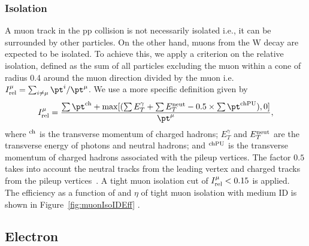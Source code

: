 \subsubsection{Isolation}
A muon track in the pp collision is not necessarily isolated i.e., it can be 
surrounded by other particles. On the other hand, muons from the W decay are 
expected to be isolated. To achieve this, we apply a criterion on the relative
isolation, defined as the \pt sum of all particles excluding the muon within a 
cone of radius 0.4 around the muon direction divided by the muon \pt i.e.
$I_{\rm rel}^\mu=\sum_{i\neq\mu}\pt^i/\pt^\mu$. We use a more specific definition given by  
\begin{equation}
\label{eq:mu_iso}
I_{\rm rel}^\mu=\frac{\sum\pt^{\rm ch}+{\rm max}[(\sum E_T^\gamma+\sum E_T^{\rm neut}-0.5\times\sum\pt^{\rm chPU}),0]}{\pt^\mu},
\end{equation}
where \pt$^{\rm ch}$ is the transverse momentum of charged hadrons; $E_T^\gamma$ and
$E_{T}^{\rm neut}$ are the transverse energy of photons and neutral hadrons; and
\pt$^{\rm chPU}$ is the transverse momentum of charged hadrons associated with the
pileup vertices. The factor $0.5$ takes into account the neutral tracks from the
leading vertex and charged tracks from the pileup vertices~\cite{Sirunyan:2018fpa}.
A tight muon isolation cut of $I_{\rm rel}^\mu < 0.15$ is applied. The efficiency
as a function of \pt and $\eta$ of tight muon isolation with medium ID is shown in
Figure~\ref{fig:muonIsoIDEff} \cite{muSF}.

\subsection{Electron }
